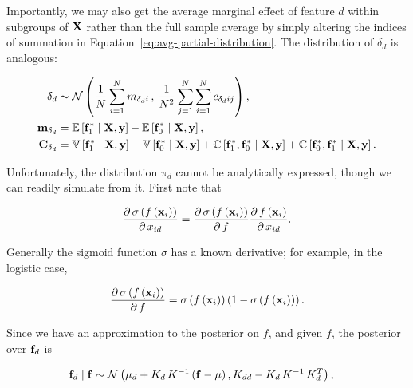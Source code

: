 \documentclass{draft}
\newcommand{\pd}{\ensuremath{\partial \,}}     %
\begin{document}
\noindent
Importantly, we may also get the average marginal effect of feature \( d \) within subgroups of \( \mathbf{X} \)
rather than the full sample average by simply altering the indices of summation in
Equation~\ref{eq:avg-partial-distribution}.
The distribution of \( \delta_d \) is analogous:

\vspace*{-\baselineskip}
\begin{align}
    \delta_d
    & \sim
    \mathcal{N} \left(
        \dfrac{1}{N} \sum_{i=1}^N m_{\delta_d i} \, , \,
        \dfrac{1}{N^2} \sum_{j=1}^N \sum_{i=1}^N c_{\delta_d ij}
    \right), \label{eq:avg-difference-distribution} \\
    \mathbf{m}_{\delta_d} & = \operatorname{\mathbb{E}} \left[ \mathbf{f}_1^\ast \mid \mathbf{X}, \mathbf{y} \right] - \operatorname{\mathbb{E}} \left[ \mathbf{f}_0^\ast \mid \mathbf{X}, \mathbf{y} \right], \\
    \mathbf{C}_{\delta_d}
    & =
    \operatorname{\mathbb{V}} \left[ \mathbf{f}_1^\ast \mid \mathbf{X}, \mathbf{y} \right]
    + \operatorname{\mathbb{V}} \left[ \mathbf{f}_0^\ast \mid \mathbf{X}, \mathbf{y} \right]
    + \operatorname{\mathbb{C}} \left[ \mathbf{f}_1^\ast, \mathbf{f}_0^\ast  \mid \mathbf{X}, \mathbf{y} \right]
    + \operatorname{\mathbb{C}} \left[ \mathbf{f}_0^\ast, \mathbf{f}_1^\ast \mid \mathbf{X}, \mathbf{y} \right].
\end{align}


Unfortunately, the distribution \( \pi_d \) cannot be analytically expressed, though we can readily simulate from it.
First note that

\begin{equation}
    \dfrac{\pd \sigma \left( f \left( \mbf{x}_i \right) \right)}{\pd x_{id}}
    =
    \dfrac{\pd \sigma \left( f \left( \mbf{x}_i \right) \right)}{\pd f}
    \dfrac{\pd f \left( \mbf{x}_i \right)}{\pd x_{id}}.
\end{equation}

Generally the sigmoid function \( \sigma \) has a known derivative;
for example, in the logistic case,

\begin{equation}
    \dfrac{\pd \sigma \left( f \left( \mbf{x}_i \right) \right)}{\pd f}
    =
    \sigma \left( f \left( \mbf{x}_i \right) \right) \left( 1 - \sigma \left( f \left( \mbf{x}_i \right) \right) \right).
\end{equation}

\noindent
Since we have an approximation to the posterior on \( f \), and given \( f \), the posterior over \( \mathbf{f}_d \) is

\begin{align}
    \mathbf{f}_d \mid \mathbf{f}
    & \sim
    \mathcal{N} \left( \mu_d + K_d \, K^{-1} \left( \mathbf{f} - \mu \right), K_{dd} - K_{d} \, K^{-1} \, K_d^T \right),
\end{align}
\end{document}
